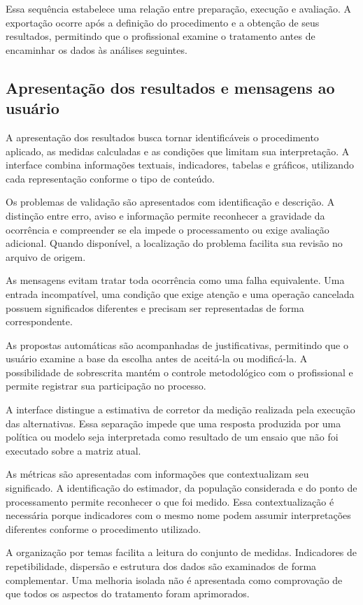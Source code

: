 Essa sequência estabelece uma relação entre preparação, execução e avaliação. A exportação ocorre após a definição do procedimento e a obtenção de seus resultados, permitindo que o profissional examine o tratamento antes de encaminhar os dados às análises seguintes.

\subsection{Apresentação dos resultados e mensagens ao usuário}
\label{subsec:resultados-mensagens}

A apresentação dos resultados busca tornar identificáveis o procedimento aplicado, as medidas calculadas e as condições que limitam sua interpretação. A interface combina informações textuais, indicadores, tabelas e gráficos, utilizando cada representação conforme o tipo de conteúdo.

Os problemas de validação são apresentados com identificação e descrição. A distinção entre erro, aviso e informação permite reconhecer a gravidade da ocorrência e compreender se ela impede o processamento ou exige avaliação adicional. Quando disponível, a localização do problema facilita sua revisão no arquivo de origem.

As mensagens evitam tratar toda ocorrência como uma falha equivalente. Uma entrada incompatível, uma condição que exige atenção e uma operação cancelada possuem significados diferentes e precisam ser representadas de forma correspondente.

As propostas automáticas são acompanhadas de justificativas, permitindo que o usuário examine a base da escolha antes de aceitá-la ou modificá-la. A possibilidade de sobrescrita mantém o controle metodológico com o profissional e permite registrar sua participação no processo.

A interface distingue a estimativa de corretor da medição realizada pela execução das alternativas. Essa separação impede que uma resposta produzida por uma política ou modelo seja interpretada como resultado de um ensaio que não foi executado sobre a matriz atual.

As métricas são apresentadas com informações que contextualizam seu significado. A identificação do estimador, da população considerada e do ponto de processamento permite reconhecer o que foi medido. Essa contextualização é necessária porque indicadores com o mesmo nome podem assumir interpretações diferentes conforme o procedimento utilizado.

A organização por temas facilita a leitura do conjunto de medidas. Indicadores de repetibilidade, dispersão e estrutura dos dados são examinados de forma complementar. Uma melhoria isolada não é apresentada como comprovação de que todos os aspectos do tratamento foram aprimorados.


